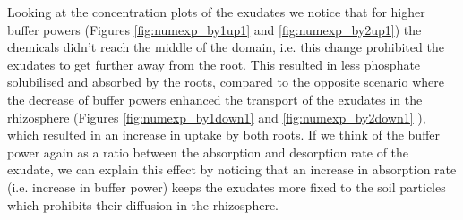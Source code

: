 \documentclass[11pt]{article}
\numberwithin{equation}{section}
\begin{document}
Looking at the concentration plots of the exudates we notice that for higher buffer powers (Figures \ref{fig:numexp_by1up1} and \ref{fig:numexp_by2up1}) the chemicals didn't reach the middle of the domain, i.e. this change prohibited the exudates to get further away from the root. This resulted in less phosphate solubilised and absorbed by the roots, compared to the opposite scenario where the decrease of buffer powers enhanced the transport of the exudates in the rhizosphere (Figures \ref{fig:numexp_by1down1} and \ref{fig:numexp_by2down1} ), which resulted in an increase in uptake by both roots. If we think of the buffer power again as a ratio between the absorption and desorption rate of the exudate, we can explain this effect by noticing that an increase in absorption rate (i.e. increase in buffer power) keeps the exudates more fixed to the soil particles which prohibits their diffusion in the rhizosphere.
\vspace{-0.3cm}
\end{document}
